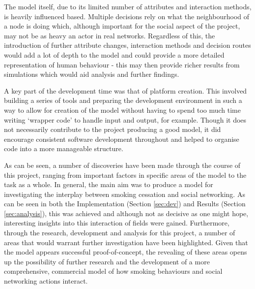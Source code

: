 \documentclass[]{report}
\begin{document}
The model itself, due to its limited number of attributes and interaction methods, is heavily influenced based. Multiple decisions rely on what the neighbourhood of a node is doing which, although important for the social aspect of the project, may not be as heavy an actor in real networks. Regardless of this, the introduction of further attribute changes, interaction methods and decision routes would add a lot of depth to the model and could provide a more detailed representation of human behaviour - this may then provide richer results from simulations which would aid analysis and further findings.

A key part of the development time was that of platform creation. This involved building a series of tools and preparing the development environment in such a way to allow for creation of the model without having to spend too much time writing `wrapper code' to handle input and output, for example. Though it does not necessarily contribute to the project producing a good model, it did encourage consistent software development throughout and helped to organise code into a more manageable structure. 

As can be seen, a number of discoveries have been made through the course of this project, ranging from important factors in specific areas of the model to the task as a whole. In general, the main aim was to produce a model for investigating the interplay between smoking cessation and social networking. As can be seen in both the Implementation (Section \ref{sec:dev}) and Results (Section \ref{sec:analysis}), this was achieved and although not as decisive as one might hope, interesting insights into this interaction of fields were gained. Furthermore, through the research, development and analysis for this project, a number of areas that would warrant further investigation have been highlighted. Given that the model appears successful proof-of-concept, the revealing of these areas opens up the possibility of further research and the development of a more comprehensive, commercial model of how smoking behaviours and social networking actions interact.
%
%


\end{document}
